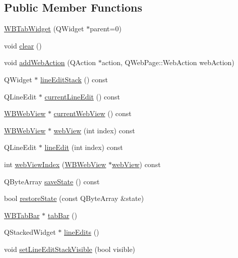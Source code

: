 \subsection*{Public Member Functions}
\begin{DoxyCompactItemize}
\item 
\hyperlink{class_w_b_tab_widget_ad9df03455c950de64486d38fc120b41e}{W\-B\-Tab\-Widget} (Q\-Widget $\ast$parent=0)
\item 
void \hyperlink{class_w_b_tab_widget_a08386e848cabd3ba2875c6d9ac3e7d67}{clear} ()
\item 
void \hyperlink{class_w_b_tab_widget_a609cb1a8d8b7c965a45c3e66f31e3614}{add\-Web\-Action} (Q\-Action $\ast$action, Q\-Web\-Page\-::\-Web\-Action web\-Action)
\item 
Q\-Widget $\ast$ \hyperlink{class_w_b_tab_widget_a2bdf617cf75849e7fb892b479e7bc0b8}{line\-Edit\-Stack} () const 
\item 
Q\-Line\-Edit $\ast$ \hyperlink{class_w_b_tab_widget_a9736f81410f28db2e7adea81f5a6745d}{current\-Line\-Edit} () const 
\item 
\hyperlink{class_w_b_web_view}{W\-B\-Web\-View} $\ast$ \hyperlink{class_w_b_tab_widget_a9e2f5d93990c02fbb4edf2418e51828b}{current\-Web\-View} () const 
\item 
\hyperlink{class_w_b_web_view}{W\-B\-Web\-View} $\ast$ \hyperlink{class_w_b_tab_widget_a99290e7824dd979d8bf98a5dc476e6e0}{web\-View} (int index) const 
\item 
Q\-Line\-Edit $\ast$ \hyperlink{class_w_b_tab_widget_a6e88905dd4a36804e063c34a15805c18}{line\-Edit} (int index) const 
\item 
int \hyperlink{class_w_b_tab_widget_a421004127a55b91c5ab52cd89004c649}{web\-View\-Index} (\hyperlink{class_w_b_web_view}{W\-B\-Web\-View} $\ast$\hyperlink{class_w_b_tab_widget_a99290e7824dd979d8bf98a5dc476e6e0}{web\-View}) const 
\item 
Q\-Byte\-Array \hyperlink{class_w_b_tab_widget_ab8f02948b84cce3f93dccfe19332fe8a}{save\-State} () const 
\item 
bool \hyperlink{class_w_b_tab_widget_a28bf3c95a61c4899051a1b16aeaec96c}{restore\-State} (const Q\-Byte\-Array \&state)
\item 
\hyperlink{class_w_b_tab_bar}{W\-B\-Tab\-Bar} $\ast$ \hyperlink{class_w_b_tab_widget_a1ee59dff3bdb9eda443650a3a04e565d}{tab\-Bar} ()
\item 
Q\-Stacked\-Widget $\ast$ \hyperlink{class_w_b_tab_widget_a27a23dcc9554dab115bf35367b47feca}{line\-Edits} ()
\item 
void \hyperlink{class_w_b_tab_widget_aafdd076c051a8500ed84333cc4b3b8f5}{set\-Line\-Edit\-Stack\-Visible} (bool visible)
\end{DoxyCompactItemize}
